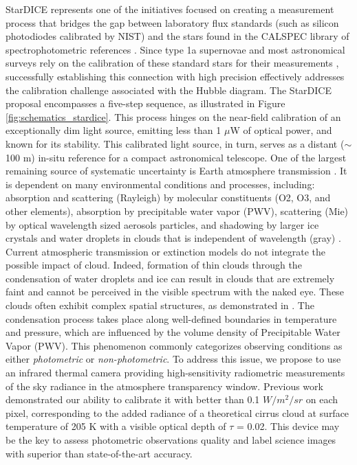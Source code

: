 \documentclass[amt, article]{copernicus}
\begin{document}
StarDICE represents one of the initiatives focused on creating a measurement process that bridges the gap between laboratory flux standards (such as silicon photodiodes calibrated by NIST) and the stars found in the CALSPEC library of spectrophotometric references \citep{Bohlin2020}. Since type 1a supernovae and most astronomical  surveys rely on the calibration of these standard stars for their measurements \citep{Bohlin2011, Betoule2013, Rubin2015, Scolnic2015, Currie2020, Brout2022, rubin2022uniform}, successfully establishing this connection with high precision effectively addresses the calibration challenge associated with the Hubble diagram. The StarDICE proposal encompasses a five-step sequence, as illustrated in Figure \ref{fig:schematics_stardice}. This process hinges on the near-field calibration of an exceptionally dim light source, emitting less than 1 $\mu$W of optical power, and known for its stability. This calibrated light source, in turn, serves as a distant ($\sim$ 100 m) in-situ reference for a compact astronomical telescope.
One of the largest remaining source of systematic uncertainty is Earth atmosphere transmission \citep{stubbs2012addressing, Stubbs2015, Li2016}. It is dependent on many environmental conditions and processes, including: absorption and scattering (Rayleigh) by molecular constituents (O2, O3, and other elements), absorption by precipitable water vapor (PWV), scattering (Mie) by optical wavelength sized aerosols particles, and shadowing by larger ice crystals and water droplets in clouds that is independent of wavelength (gray) \citep{Burke2010, Burke2017}. Current atmospheric transmission or extinction models do not integrate the possible impact of cloud. Indeed, formation of thin clouds through the condensation of water droplets and ice can result in clouds that are extremely faint and cannot be perceived in the visible spectrum with the naked eye. These clouds often exhibit complex spatial structures, as demonstrated in \citet{Burke2014}. The condensation process takes place along well-defined boundaries in temperature and pressure, which are influenced by the volume density of Precipitable Water Vapor (PWV). This phenomenon commonly categorizes observing conditions as either \textit{photometric} or \textit{non-photometric}.
To address this issue, we propose to use an infrared thermal camera providing high-sensitivity radiometric measurements of the sky radiance in the atmosphere transparency window. Previous work demonstrated our ability to calibrate it with better than 0.1 $W/m^{2}/sr$ on each pixel, corresponding to the added radiance of a theoretical cirrus cloud at surface temperature of 205 K with a visible optical depth of $\tau$ = 0.02. This device may be the key to assess photometric observations quality and label science images with superior than state-of-the-art accuracy.
\end{document}
